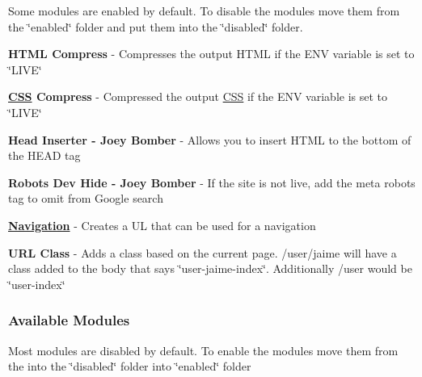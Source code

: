 Some modules are enabled by default. To disable the modules move them from the \char`\"{}enabled\char`\"{} folder and put them into the \char`\"{}disabled\char`\"{} folder.


\begin{DoxyItemize}
\item {\bfseries H\-T\-M\-L Compress} -\/ Compresses the output H\-T\-M\-L if the E\-N\-V variable is set to \char`\"{}\-L\-I\-V\-E\char`\"{}
\end{DoxyItemize}


\begin{DoxyItemize}
\item {\bfseries \hyperlink{class_c_s_s}{C\-S\-S} Compress} -\/ Compressed the output \hyperlink{class_c_s_s}{C\-S\-S} if the E\-N\-V variable is set to \char`\"{}\-L\-I\-V\-E\char`\"{}
\end{DoxyItemize}


\begin{DoxyItemize}
\item {\bfseries Head Inserter -\/ Joey Bomber} -\/ Allows you to insert H\-T\-M\-L to the bottom of the H\-E\-A\-D tag
\end{DoxyItemize}


\begin{DoxyItemize}
\item {\bfseries Robots Dev Hide -\/ Joey Bomber} -\/ If the site is not live, add the meta robots tag to omit from Google search
\end{DoxyItemize}


\begin{DoxyItemize}
\item {\bfseries \hyperlink{class_navigation}{Navigation}} -\/ Creates a U\-L that can be used for a navigation
\end{DoxyItemize}


\begin{DoxyItemize}
\item {\bfseries U\-R\-L Class} -\/ Adds a class based on the current page. /user/jaime will have a class added to the body that says \char`\"{}user-\/jaime-\/index\char`\"{}. Additionally /user would be \char`\"{}user-\/index\char`\"{}
\end{DoxyItemize}

\subsubsection*{Available Modules}

Most modules are disabled by default. To enable the modules move them from the into the \char`\"{}disabled\char`\"{} folder into \char`\"{}enabled\char`\"{} folder


